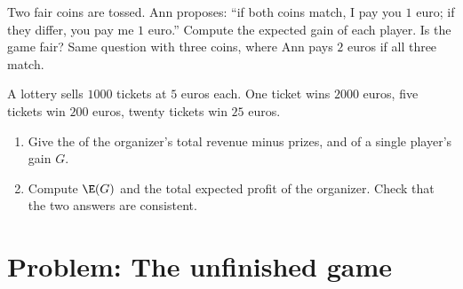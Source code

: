 \begin{exercise}[$\star\star$]\label{exo:g11:prob:10}
Two fair coins are tossed. Ann proposes: ``if both coins match, I pay you
$1$ euro; if they differ, you pay me $1$ euro.'' Compute the expected
gain of each player. Is the game fair? Same question with three coins,
where Ann pays $2$ euros if all three match.
\end{exercise}

\begin{exercise}[$\star\star\star$]\label{exo:g11:prob:11}
A lottery sells $1000$ tickets at $5$ euros each. One ticket wins
$2000$ euros, five tickets win $200$ euros, twenty tickets win $25$
euros.
\begin{enumerate}
  \item Give the  of the organizer's total revenue minus
        prizes, and of a single player's gain $G$.
  \item Compute $\E(G)$ and the total expected profit of the organizer.
        Check that the two answers are consistent.
\end{enumerate}
\end{exercise}

\section{Problem: The unfinished game}

